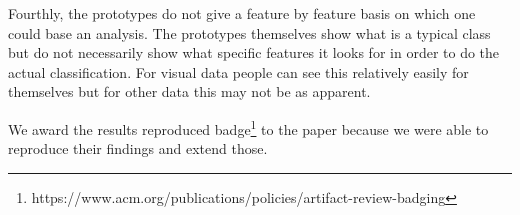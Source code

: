 Fourthly, the prototypes do not give a feature by feature basis on which one could base an analysis. The prototypes themselves show what is a typical class but do not necessarily show what specific features it looks for in order to do the actual classification. For visual data people can see this relatively easily for themselves but for other data this may not be as apparent. 

We award the results reproduced badge\footnote{https://www.acm.org/publications/policies/artifact-review-badging} to the paper because we were able to reproduce their findings and extend those.